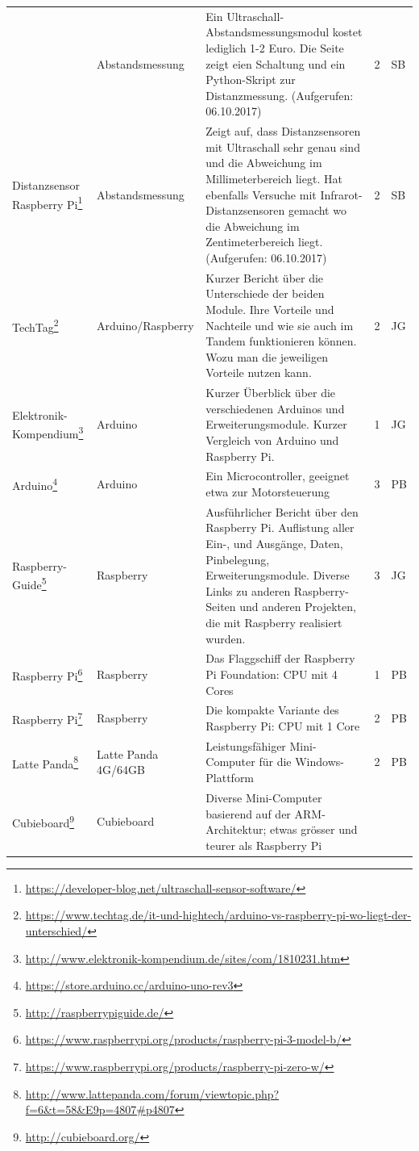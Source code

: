 \documentclass[a4paper,11pt]{scrartcl}
\begin{document}
\begin{landscape}
{\begin{longtable}{|p{4cm}|p{4cm}|p{12cm}|l|l|}
& Abstandsmessung
& Ein Ultraschall-Abstandsmessungsmodul kostet lediglich 1-2 Euro. Die Seite zeigt eien Schaltung und ein Python-Skript zur Distanzmessung. (Aufgerufen: 06.10.2017)
& 2 
& SB \\
Distanzsensor Raspberry Pi\footnote{\url{https://developer-blog.net/ultraschall-sensor-software/}}
& Abstandsmessung
& Zeigt auf, dass Distanzsensoren mit Ultraschall sehr genau sind und die Abweichung im Millimeterbereich liegt. Hat ebenfalls Versuche mit Infrarot-Distanzsensoren gemacht wo die Abweichung im Zentimeterbereich liegt. (Aufgerufen: 06.10.2017)
& 2 
& SB \\
TechTag\footnote{\url{https://www.techtag.de/it-und-hightech/arduino-vs-raspberry-pi-wo-liegt-der-unterschied/}}
& Arduino/Raspberry
& Kurzer Bericht über die Unterschiede der beiden Module. Ihre Vorteile und Nachteile und wie sie auch im Tandem funktionieren können. Wozu man die jeweiligen Vorteile nutzen kann.
& 2 
& JG \\
Elektronik-Kompendium\footnote{\url{http://www.elektronik-kompendium.de/sites/com/1810231.htm}}
& Arduino
& Kurzer Überblick über die verschiedenen Arduinos und Erweiterungsmodule. Kurzer Vergleich von Arduino und Raspberry Pi.
& 1 
& JG \\
Arduino\footnote{\url{https://store.arduino.cc/arduino-uno-rev3}}
& Arduino
& Ein Microcontroller, geeignet etwa zur Motorsteuerung
& 3 
& PB \\
Raspberry-Guide\footnote{\url{http://raspberrypiguide.de/}}
& Raspberry
& Ausführlicher Bericht über den Raspberry Pi. Auflistung aller Ein-, und Ausgänge, Daten, Pinbelegung, Erweiterungsmodule. Diverse Links zu anderen Raspberry-Seiten und anderen Projekten, die mit Raspberry realisiert wurden.
& 3 
& JG \\
Raspberry Pi\footnote{\url{https://www.raspberrypi.org/products/raspberry-pi-3-model-b/}}
& Raspberry
& Das Flaggschiff der Raspberry Pi Foundation: CPU mit 4 Cores
& 1 
& PB \\
Raspberry Pi\footnote{\url{https://www.raspberrypi.org/products/raspberry-pi-zero-w/}}
& Raspberry
& Die kompakte Variante des Raspberry Pi: CPU mit 1 Core
& 2 
& PB \\
Latte Panda\footnote{\url{http://www.lattepanda.com/forum/viewtopic.php?f=6\&t=58\&E9p=4807\#p4807}}
& Latte Panda 4G/64GB
& Leistungsfähiger Mini-Computer für die Windows-Plattform
& 2 
& PB \\
Cubieboard\footnote{\url{http://cubieboard.org/}}
& Cubieboard
& Diverse Mini-Computer basierend auf der ARM-Architektur; etwas grösser und teurer als Raspberry Pi

\end{longtable}}
\end{landscape}
\end{document}
